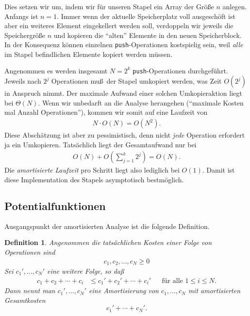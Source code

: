 \documentclass[10pt,reqno]{amsart}
\numberwithin{equation}{section}
\newtheorem{definition}{Definition}[section]
\newcommand\bc[1]{\left({#1}\right)}
\begin{document}
Dies setzen wir um, indem wir f\"ur unseren Stapel ein Array der Gr\"o\ss e $n$ anlegen.
Anfangs ist $n=1$.
Immer wenn der aktuelle Speicherplatz voll ausgesch\"oft ist aber ein weiteres Element eingekellert werden soll, verdoppeln wir jeweils die Speichergr\"o\ss e $n$ und kopieren die ``alten'' Elemente in den neuen Speicherblock.
In der Konsequenz k\"onnen einzelnen {\tt push}-Operationen kostspielig sein, weil {\em alle} im Stapel befindlichen Elemente kopiert werden m\"ussen.

Angenommen es werden insgesamt $N=2^k$ {\tt push}-Operationen durchgef\"uhrt.
Jeweils nach $2^j$ Operationen mu\ss\ der Stapel umkopiert werden, was Zeit $O(2^j)$ in Anspruch nimmt.
Der maximale Aufwand einer solchen Umkopieraktion liegt bei $\Theta(N)$.
Wenn wir unbedarft an die Analyse herangehen (``maximale Kosten mal Anzahl Operationen''), kommen wir somit auf eine Laufzeit von
\begin{align*}
	N\cdot O(N)=O(N^2).
\end{align*}
Diese Absch\"atzung ist aber zu pessimistisch, denn nicht {\em jede} Operation erfordert ja ein Umkopieren.
Tats\"achlich liegt der Gesamtaufwand nur bei
\begin{align*}
	O(N)+O\bc{\sum_{j=1}^k2^j}=O(N).
\end{align*}
Die {\em amortisierte Laufzeit} pro Schritt liegt also lediglich bei $O(1)$.
Damit ist diese Implementation des Stapels asymptotisch bestm\"oglich.

\subsection{Potentialfunktionen}\label{sec_amor_potential}

Ausgangspunkt der amortisierten Analyse ist die folgende Definition.

\begin{definition}\label{def_amor}
	Angenommen die tats\"achlichen Kosten einer Folge von Operationen sind
		\begin{align*}
			c_1,c_2,\ldots,c_N\geq0
		\end{align*}
	Sei $c_1',\ldots,c_N'$ eine weitere Folge, so da\ss
				\begin{align*}
					c_1+c_2+\cdots+c_i&\leq c_1'+c_2'+\cdots+c_i'&&\mbox{f\"ur alle }1\leq i\leq N.
				\end{align*}
	Dann nennt man $c_1',\ldots,c_N'$ eine \emph{Amortisierung} von $c_1,\ldots,c_N$ mit
			\emph{amortisierten Gesamtkosten} $$c_1'+\cdots+c_N'.$$
\end{definition}
\end{document}
